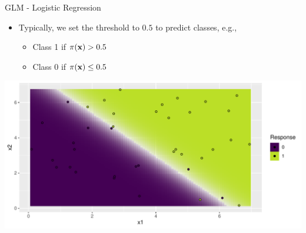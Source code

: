 \documentclass[11pt,compress,t,notes=noshow, aspectratio=169, xcolor=table]{beamer}
\begin{document}
\begin{frame}{GLM - Logistic Regression}

\begin{itemize}
    \item Typically, we set the threshold to $0.5$ to predict classes, e.g.,
    \begin{itemize}
        \item Class 1 if $\pi(\xv) > 0.5$
        \item Class 0 if $\pi(\xv) \leq 0.5$
    \end{itemize}
\end{itemize}

\medskip
\centering
\includegraphics[width = \textwidth]{figure/reg_class_log_6.pdf}
\end{frame}


\end{document}
